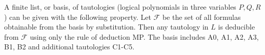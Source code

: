 A finite list, or basis, of tautologies (logical polynomials in three variables $P, Q, R$) can be given with the following property. Let $\mathcal{F}$ be the set of all formulas obtainable from the basis by substitution. Then any tautology in $L$ is deducible from $\mathcal{F}$ using only the rule of deduction MP. The basis includes A0, A1, A2, A3, B1, B2 and additional tautologies C1-C5.
